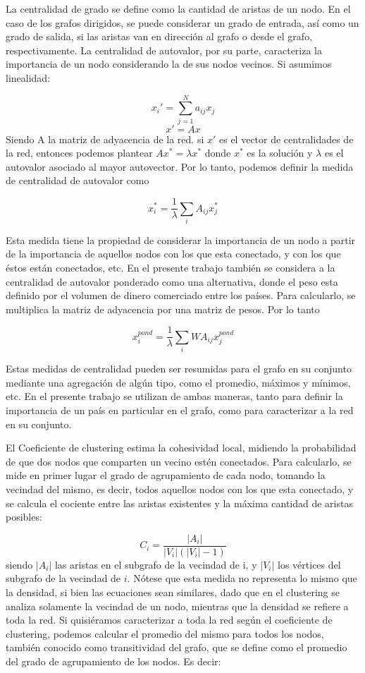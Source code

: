 \documentclass[class=article, crop=false]{standalone}
\begin{document}
La centralidad de grado se define como la cantidad de aristas de un nodo. En el caso de los grafos dirigidos, se puede considerar un grado de entrada, así como un grado de salida, si las aristas van en dirección al grafo o desde el grafo, respectivamente.
La centralidad de autovalor, por su parte, caracteriza la importancia de un nodo considerando la de sus nodos vecinos. Si asumimos linealidad:

$$
x_i'= \sum_{j=1}^{N} a_{ij}x_{j}
$$
$$
x' = Ax
$$
Siendo A la matriz de adyacencia de la red. si $x'$ es el vector de centralidades de la red, entonces podemos plantear $Ax^* = \lambda x^*$ donde $x^*$ es la solución y  $\lambda$ es el autovalor asociado al mayor autovector.  Por lo tanto, podemos definir la medida de centralidad de autovalor como

$$
x_i^*=\frac{1}{\lambda}  \sum_{i} A_{ij}x_{j}^*
$$

Esta medida tiene la propiedad de considerar la importancia de un nodo a partir de la importancia de aquellos nodos con los que esta conectado, y con los que éstos están conectados, etc. En el presente trabajo también se considera a la centralidad de autovalor ponderado como una alternativa, donde el peso esta definido por el volumen de dinero comerciado entre los países. Para calcularlo, se multiplica la matriz de adyacencia por una matriz de pesos. Por lo tanto

$$
x_i^{pond}=\frac{1}{\lambda}  \sum_{i} WA_{ij}x_{j}^{pond}
$$

Estas medidas de centralidad pueden ser resumidas para el grafo en su conjunto mediante una agregación de algún tipo, como el promedio, máximos y mínimos, etc. En el presente trabajo se utilizan de ambas maneras, tanto para definir la importancia de un país en particular en el grafo, como para caracterizar a la red en su conjunto.
\par

El Coeficiente de clustering estima la cohesividad local, midiendo la probabilidad de que dos nodos que comparten un vecino estén conectados. Para calcularlo, se mide en primer lugar el grado de agrupamiento de cada nodo, tomando la vecindad del mismo, es decir, todos aquellos nodos con los que esta conectado, y se calcula el cociente entre las aristas existentes y la máxima cantidad de aristas posibles:

$$
C_i = \frac{|A_i|}{|V_i|(|V_i|-1)}
$$
siendo $|A_i|$ las aristas en el subgrafo de la vecindad de i, y $|V_i|$ los vértices del subgrafo de la vecindad de $i$. Nótese que esta medida no representa lo mismo que la densidad, si bien las ecuaciones sean similares, dado que en el clustering se analiza solamente la vecindad de un nodo, mientras que la densidad se refiere a toda la red.
Si quisiéramos caracterizar a toda la red según el coeficiente de clustering, podemos calcular el promedio del mismo para todos los nodos, también conocido como transitividad del grafo, que se define como el promedio del grado de agrupamiento de los nodos. Es decir:
\end{document}
